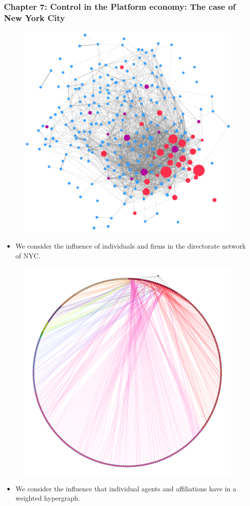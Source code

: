 \documentclass[10pt]{beamer}
\begin{document}
\begin{frame} \frametitle{Chapter 7: Control in the Platform economy: The case of New York City}
\begin{figure}[h]
\centering
\includegraphics[scale=0.15]{../Images/institutions.png}
\end{figure}
\begin{itemize}
\medskip
\item We consider the influence of individuals and firms in the directorate network of NYC.
\end{itemize}
\end{frame}


\begin{frame}
\begin{figure}[h]
\centering
\includegraphics[scale=0.18]{../Images/guarantryBipartite.png}
\end{figure}
\begin{itemize}
\medskip
\item We consider the influence that individual agents and affiliations have in a weighted hypergraph.
\end{itemize}
\end{frame}
\end{document}
